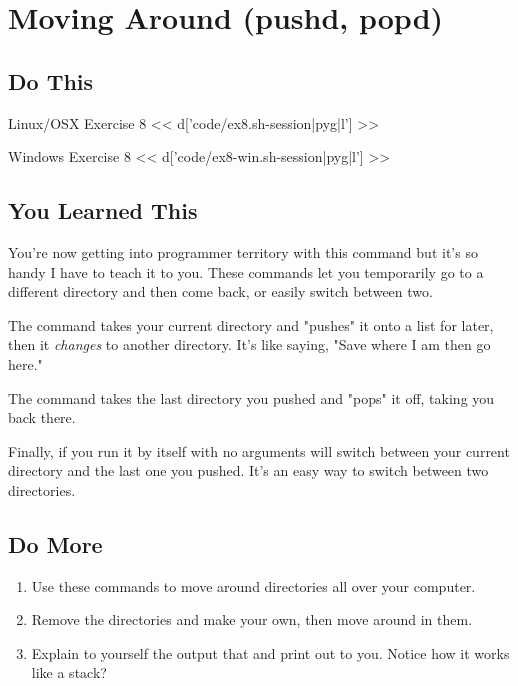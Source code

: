 \chapter{Moving Around (pushd, popd)}

\section{Do This}

\begin{code}{Linux/OSX Exercise 8}
<< d['code/ex8.sh-session|pyg|l'] >>
\end{code}

\begin{code}{Windows Exercise 8}
<< d['code/ex8-win.sh-session|pyg|l'] >>
\end{code}

\section{You Learned This}

You're now getting into programmer territory with this command but it's so
handy I have to teach it to you.  These commands let you temporarily go
to a different directory and then come back, or easily switch between
two.

The  command takes your current directory and "pushes" it
onto a list for later, then it \emph{changes} to another directory.  It's
like saying, "Save where I am then go here."

The  command takes the last directory you pushed and "pops"
it off, taking you back there.

Finally,  if you run it by itself with no arguments will
switch between your current directory and the last one you pushed.  It's
an easy way to switch between two directories.

\section{Do More}

\begin{enumerate}
\item Use these commands to move around directories all over your
    computer.
\item Remove the  directories and make your own, then
    move around in them.
\item Explain to yourself the output that  and 
    print out to you.  Notice how it works like a stack?
\end{enumerate}

